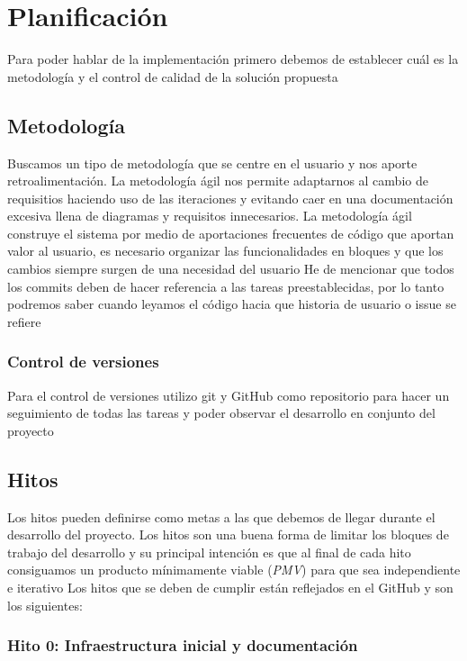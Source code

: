 \chapter{Planificación}

Para poder hablar de la implementación primero debemos de establecer cuál es la metodología y el control de calidad 
de la solución propuesta

\section{Metodología}

Buscamos un tipo de metodología que se centre en el usuario y nos aporte retroalimentación.
La metodología ágil nos permite adaptarnos al cambio de requisitios haciendo uso de las iteraciones y 
evitando caer en una documentación excesiva llena de diagramas y requisitos innecesarios.
La metodología ágil construye el sistema por medio de aportaciones frecuentes de código que aportan valor 
al usuario, es necesario organizar las funcionalidades en bloques y que los cambios siempre surgen de una 
necesidad del usuario
He de mencionar que todos los commits deben de hacer referencia a las tareas preestablecidas, por lo tanto 
podremos saber cuando leyamos el código hacia que historia de usuario o issue se refiere

\subsection{Control de versiones}
Para el control de versiones utilizo git y GitHub como repositorio para hacer un seguimiento de todas las tareas
y poder observar el desarrollo en conjunto del proyecto 

\section{Hitos}
Los hitos pueden definirse como metas a las que debemos de llegar durante el desarrollo del proyecto.
Los hitos son una buena forma de limitar los bloques de trabajo del desarrollo y su principal intención es que 
al final de cada hito consiguamos un producto mínimamente viable (\textit{PMV}) para que sea independiente e iterativo 
Los hitos que se deben de cumplir están reflejados en el GitHub y son los siguientes: 
\subsection*{Hito 0: Infraestructura inicial y documentación}

